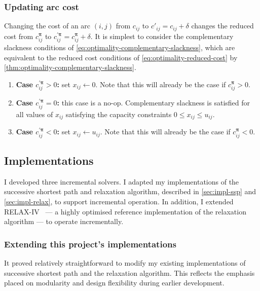 \subsubsection{Updating arc cost}

Changing the cost of an arc $(i,j)$ from $c_{ij}$ to $c'_{ij} = c_{ij} + \delta$ changes the reduced cost from $c_{ij}^{\boldsymbol{\pi}}$ to $c_{ij}^{\prime\boldsymbol{\pi}} = c_{ij}^{\boldsymbol{\pi}} + \delta$. It is simplest to consider the complementary slackness conditions of \cref{eq:optimality-complementary-slackness}, which are equivalent to the reduced cost conditions of \cref{eq:optimality-reduced-cost} by \cref{thm:optimality-complementary-slackness}.

\begin{enumerate}
    \item \textbf{Case $c_{ij}^{\prime\boldsymbol{\pi}} > 0$:} set $x_{ij} \gets 0$. Note that this will already be the case if $c_{ij}^{\boldsymbol{\pi}} > 0$.
    \item \textbf{Case $c_{ij}^{\prime\boldsymbol{\pi}} = 0$: } this case is a no-op. Complementary slackness is satisfied for all values of $x_{ij}$ satisfying the capacity constraints $0 \leq x_{ij} \leq u_{ij}$.
    \item \textbf{Case $c_{ij}^{\prime\boldsymbol{\pi}} < 0$: } set $x_{ij} \gets u_{ij}$. Note that this will already be the case if $c_{ij}^{\boldsymbol{\pi}} < 0$.
\end{enumerate}

\subsection{Implementations} \label{sec:impl-incremental-impl}

I developed three incremental solvers. I adapted my implementations of the successive shortest path and relaxation algorithm, described in \cref{sec:impl-ssp} and \cref{sec:impl-relax}, to support incremental operation. In addition, I extended RELAX-IV~\cite{BertsekasCodes:1988,RelaxIV:2011} --- a highly optimised reference implementation of the relaxation algorithm --- to operate incrementally.

\subsubsection{Extending this project's implementations}
It proved relatively straightforward to modify my existing implementations of successive shortest path and the relaxation algorithm. This reflects the emphasis placed on modularity and design flexibility during earlier development.

